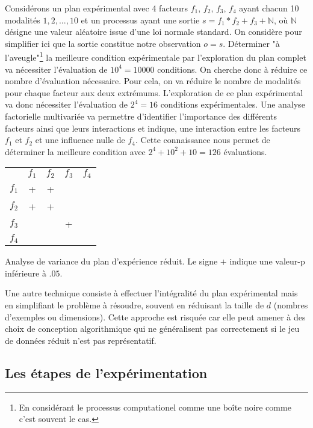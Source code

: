 Considérons un plan expérimental avec 4 facteurs $f_1$, $f_2$, $f_3$, $f_4$ ayant chacun 10 modalités ${1, 2, ..., 10}$ et un processus ayant une sortie $s=f_1*f_2+f_3+\mathbb{N}$, où $\mathbb{N}$ désigne une valeur aléatoire issue d'une loi normale standard. On considère pour simplifier ici que la sortie constitue notre observation $o=s$. Déterminer "à l'aveugle"\footnote{En considérant le processus computationel comme une boîte noire comme c'est souvent le cas.} la meilleure condition expérimentale par l'exploration du plan complet va nécessiter l'évaluation de $10^4=10000$ conditions. On cherche donc à réduire ce nombre d'évaluation nécessaire. Pour cela, on va réduire le nombre de modalités pour chaque facteur aux deux extrémums. L'exploration de ce plan expérimental va donc nécessiter l'évaluation de $2^4 = 16$ conditions expérimentales. Une analyse factorielle multivariée va permettre d'identifier l'importance des différents facteurs ainsi que leurs interactions et indique, une interaction entre les facteurs $f_1$ et $f_2$ et une influence nulle de $f_4$. Cette connaissance nous permet de déterminer la meilleure condition avec $2^4+10^2+10=126$ évaluations.

\begin{margintable}
\begin{tabular}{ccccc}
  & $f_1$ & $f_2$ & $f_3$ & $f_4$ \\
$f_1$  &  + & + & & \\
$f_2$  & + & + & & \\
$f_3$  & & & + & \\
$f_4$  & & & & \\
\end{tabular}
\caption{Analyse de variance du plan d'expérience réduit. Le signe $+$ indique une valeur-p inférieure à $.05$.}
\label{tab:anova}
\end{margintable}

Une autre technique consiste à effectuer l'intégralité du plan expérimental mais en simplifiant le problème à résoudre, souvent en réduisant la taille de $d$ (nombres d'exemples ou dimensions). Cette approche est risquée car elle peut amener à des choix de conception algorithmique qui ne généralisent pas correctement si le jeu de données réduit n'est pas représentatif.

\subsection{Les étapes de l'expérimentation}

